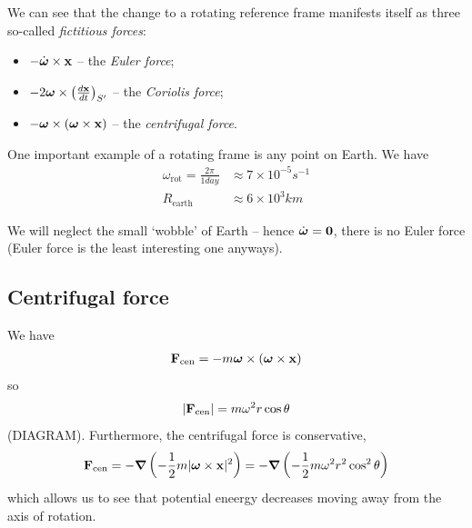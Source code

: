 \documentclass{../../template/note}
\begin{document}
    We can see that the change to a rotating reference frame manifests itself as three so-called \emph{fictitious forces}:
    \begin{itemize}
        \item \(-\dot{\V \omega} \times \V x\) -- the \emph{Euler force};
        \item \(-2 \V \omega \times \left(\frac{d\V x}{dt}\right)_{S'}\) -- the \emph{Coriolis force};
        \item \(-\V \omega \times (\V \omega \times \V x)\) -- the \emph{centrifugal force}.
    \end{itemize}
    

    One important example of a rotating frame is any point on Earth. We have
    \begin{align*}
        \omega_\text{rot} = \frac{2\pi}{1 \si{day}} &\approx 7 \times 10^{-5} \si{s^{-1}} \\
        R_\text{earth} &\approx 6 \times 10^{3} \si{km}
    \end{align*}

    We will neglect the small `wobble' of Earth -- hence \(\dot{\V \omega} = \V 0\), there is no Euler force (Euler force is the least interesting one anyways).
    
    \subsection{Centrifugal force}
    
    We have
    \begin{align*}
        \V F_\text{cen} = -m \V \omega \times (\V \omega \times \V x)
    \end{align*}
    so
    \begin{align*}
        |\V F_\text{cen}| = m\omega^2 r\cos \theta
    \end{align*}
    (DIAGRAM). Furthermore, the centrifugal force is conservative,
    \begin{align*}
        \V F_\text{cen} = -\grad \left(-\frac 1 2 m|\V \omega \times \V x|^2\right) = -\grad \left(-\frac 1 2 m\omega^2r^2\cos^2\theta\right)
    \end{align*}
    which allows us to see that potential eneergy decreases moving away from the axis of rotation.
\end{document}
